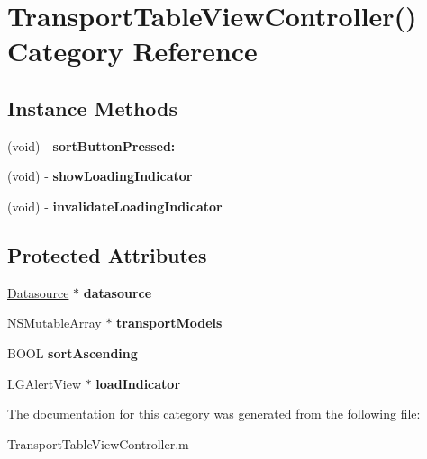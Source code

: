 \hypertarget{category_transport_table_view_controller_07_08}{}\section{Transport\+Table\+View\+Controller() Category Reference}
\label{category_transport_table_view_controller_07_08}
\subsection*{Instance Methods}
\begin{DoxyCompactItemize}
\item 
(void) -\/ {\bfseries sort\+Button\+Pressed\+:}\hypertarget{category_transport_table_view_controller_07_08_a21653dc5b6eb7f12f5a0c888e261f6e6}{}\label{category_transport_table_view_controller_07_08_a21653dc5b6eb7f12f5a0c888e261f6e6}

\item 
(void) -\/ {\bfseries show\+Loading\+Indicator}\hypertarget{category_transport_table_view_controller_07_08_acb647eb3795c7d040d3861164e99c602}{}\label{category_transport_table_view_controller_07_08_acb647eb3795c7d040d3861164e99c602}

\item 
(void) -\/ {\bfseries invalidate\+Loading\+Indicator}\hypertarget{category_transport_table_view_controller_07_08_a173849668b52aa9480d2a6d1caf2b31d}{}\label{category_transport_table_view_controller_07_08_a173849668b52aa9480d2a6d1caf2b31d}

\end{DoxyCompactItemize}
\subsection*{Protected Attributes}
\begin{DoxyCompactItemize}
\item 
\hyperlink{interface_datasource}{Datasource} $\ast$ {\bfseries datasource}\hypertarget{category_transport_table_view_controller_07_08_af6de267b56bbad3b3193ed5097342d80}{}\label{category_transport_table_view_controller_07_08_af6de267b56bbad3b3193ed5097342d80}

\item 
N\+S\+Mutable\+Array $\ast$ {\bfseries transport\+Models}\hypertarget{category_transport_table_view_controller_07_08_a1a46581c1e4c90b5a1acc598452b6053}{}\label{category_transport_table_view_controller_07_08_a1a46581c1e4c90b5a1acc598452b6053}

\item 
B\+O\+OL {\bfseries sort\+Ascending}\hypertarget{category_transport_table_view_controller_07_08_ad31971fa4547718526a807753611d40c}{}\label{category_transport_table_view_controller_07_08_ad31971fa4547718526a807753611d40c}

\item 
L\+G\+Alert\+View $\ast$ {\bfseries load\+Indicator}\hypertarget{category_transport_table_view_controller_07_08_a6a5604a3a19f285fb68b0045efe01898}{}\label{category_transport_table_view_controller_07_08_a6a5604a3a19f285fb68b0045efe01898}

\end{DoxyCompactItemize}


The documentation for this category was generated from the following file\+:\begin{DoxyCompactItemize}
\item 
Transport\+Table\+View\+Controller.\+m\end{DoxyCompactItemize}
